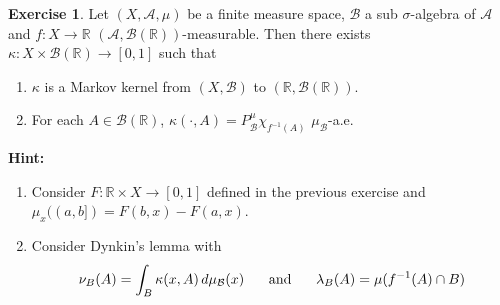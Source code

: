 \documentclass{book}
\theoremstyle{definition}
\newtheorem{ex}[definition]{Exercise}
\newcommand{\kap}{\kappa}
\newcommand{\lam}{\lambda}
\newcommand{\sig}{\sigma}
\newcommand{\R}{\mathbb{R}}
\newcommand{\MA}{\mathcal{A}}
\newcommand{\MB}{\mathcal{B}}
\DeclareMathOperator*{\0}{\mbf{0}}
\DeclareMathOperator*{\1}{\mbf{1}}
\newcommand{\dmu}{\, d \mu}
\begin{document}
	\begin{ex}
		Let $(X, \MA, \mu)$ be a finite measure space, $\MB$ a sub $\sig$-algebra of $\MA$ and $f: X \rightarrow \R$ $(\MA, \MB(\R))$-measurable. Then there exists $\kap: X \times \MB(\R) \rightarrow [0,1]$ such that 
		\begin{enumerate}
			\item $\kap$ is a Markov kernel from $(X, \MB)$ to $(\R, \MB(\R))$.
			\item For each $A \in \MB(\R)$, $\kap(\cdot, A) = P^{\mu}_{\MB}\chi_{f^{-1}(A)}$ $\mu_{\MB}$-a.e.
		\end{enumerate}
		\textbf{Hint:} 
		\begin{enumerate}
			\item Consider $F: \R \times X \rightarrow [0,1]$ defined in the previous exercise and $\mu_x((a,b]) = F(b,x) - F(a,x)$. 
			\item Consider Dynkin's lemma with $$\nu_B(A) = \int_B \kap(x, A) \dmu_{\MB}(x) \hspace{.5cm} \text{ and } \hspace{.5cm} \lam_B(A) = \mu(f^{-1}(A) \cap B)$$
		\end{enumerate}
	\end{ex}
	
\end{document}
